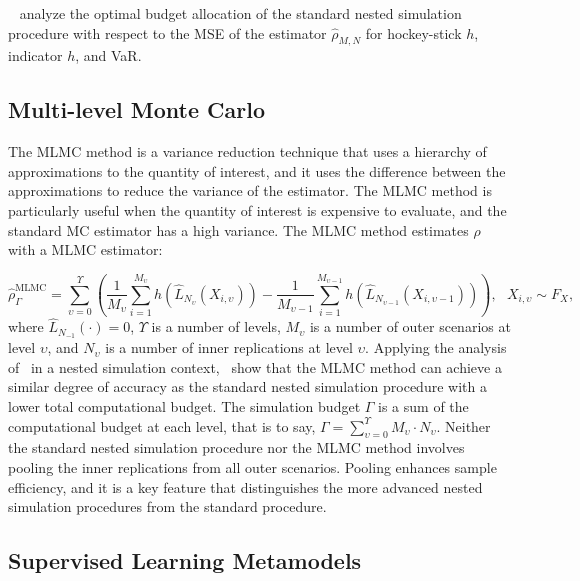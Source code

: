 ~\cite{gordy2010nested} analyze the optimal budget allocation of the standard nested simulation procedure with respect to the MSE of the estimator $\hat{\rho}_{M, N}$ for hockey-stick $h$, indicator $h$, and VaR.

\subsection{Multi-level Monte Carlo}

The MLMC method is a variance reduction technique that uses a hierarchy of approximations to the quantity of interest, and it uses the difference between the approximations to reduce the variance of the estimator.
The MLMC method is particularly useful when the quantity of interest is expensive to evaluate, and the standard MC estimator has a high variance.
The MLMC method estimates $\rho$ with a MLMC estimator:

\begin{equation*}
    \hat{\rho}^{\text{MLMC}}_\Gamma = \sum_{\upsilon=0}^{\Upsilon} \left( \frac{1}{M_{\upsilon}} \sum_{i=1}^{M_{\upsilon}} h(\hat{L}_{N_{\upsilon}}(X_{i, \upsilon})) - \frac{1}{M_{\upsilon-1}} \sum_{i=1}^{M_{\upsilon-1}} h(\hat{L}_{N_{\upsilon-1}}(X_{i, \upsilon-1})) \right), ~~~ X_{i, \upsilon} \sim F_X,
\end{equation*}
where $\hat{L}_{N_{-1}}(\cdot) = 0$, $\Upsilon$ is a number of levels, $M_{\upsilon}$ is a number of outer scenarios at level $\upsilon$, and $N_{\upsilon}$ is a number of inner replications at level $\upsilon$.
Applying the analysis of~\cite{giles2015multilevel} in a nested simulation context,~\cite{giles2019multilevel} show that the MLMC method can achieve a similar degree of accuracy as the standard nested simulation procedure with a lower total computational budget.
The simulation budget $\Gamma$ is a sum of the computational budget at each level, that is to say, $\Gamma = \sum_{\upsilon=0}^{\Upsilon} M_{\upsilon} \cdot N_{\upsilon}$.
Neither the standard nested simulation procedure nor the MLMC method involves pooling the inner replications from all outer scenarios.
Pooling enhances sample efficiency, and it is a key feature that distinguishes the more advanced nested simulation procedures from the standard procedure.

\subsection{Supervised Learning Metamodels}

